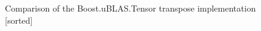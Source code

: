 \begin{figure}[htb]
    \centering
    \caption*{Comparison of the Boost.uBLAS.Tensor transpose implementation [sorted]}
    \label{fig:trans_inplace_Sspeedup_per220}
    \qquad
    \label{fig:trans_inplace_Dspeedup_per220}
\end{figure}

